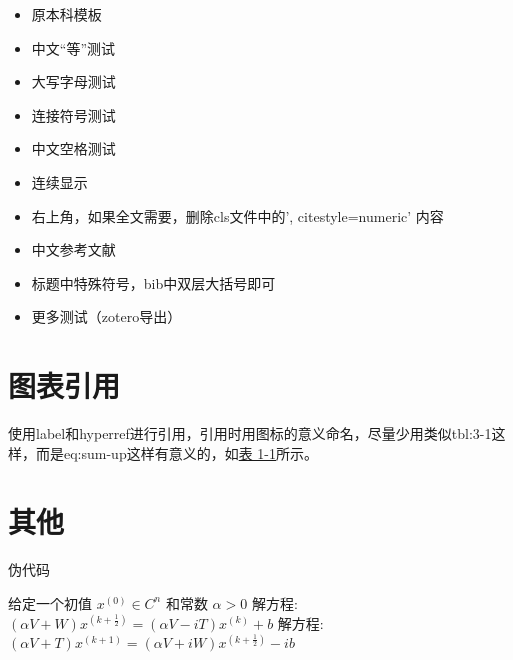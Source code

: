 \documentclass[AutoFakeBold]{LZUThesis}
\begin{document}
\begin{itemize}
    \item 原本科模板\cite{partl2016}
    \item 中文“等”测试\cite{partl2021}
    \item 大写字母测试\cite{partl2022-2}
    \item 连接符号测试\cite{partl2022-3}
    \item 中文空格测试\cite{partl2022}
    \item 连续显示\cite{partl2021,partl2022-2,partl2022-3}
    \item 右上角\supercite{partl2016,partl2021,partl2022-2}，如果全文需要，删除cls文件中的', citestyle=numeric' 内容
    \item 中文参考文献 \cite{李刚2006基于动态光谱的脉搏血氧测量精度分析}
    \item 标题中特殊符号，bib中双层大括号即可 \cite{PhysRevLett.108.024101}
    \item 更多测试（zotero导出）\cite{huangInvestigationThermalRectification2024, wanModulatingThermalConductivity2024, wuThermalRectificationAsymmetric2024, xiaoMOFNanozymemediatedAcetylcholinesterasefree2024}
\end{itemize}

\section{图表引用}


使用label和hyperref进行引用，引用时用图标的意义命名，尽量少用类似tbl:3-1这样，而是eq:sum-up这样有意义的，如\hyperref[tbl:mole]{表 1-1}所示。

\section{其他}


伪代码

\begin{algorithm}[H]
    \caption{PMHSS 算法\label{Alg:PMHSS}}
    \begin{algorithmic}[1]
        \State 给定一个初值 $ x^{(0)} \in C^{n} $  和常数 $\alpha>0$
        \State 解方程: $(\alpha V+W)x^{(k+\frac{1}{2})}=(\alpha V-i T)x^{(k)}+b $
        \State 解方程: $(\alpha V+T)x^{(k+1)}=(\alpha V+i W)x^{(k+\frac{1}{2})}-i b$
        \EndFor
    \end{algorithmic}
\end{algorithm}
\end{document}
